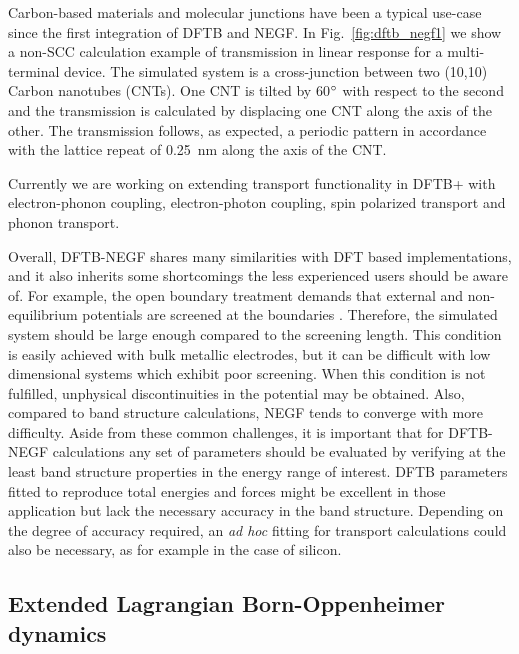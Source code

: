 \documentclass{revtex4-1}
\newcommand{\dftbp}{DFTB+}
\begin{document}
Carbon-based materials and molecular junctions have been a typical use-case
since the first integration of DFTB and NEGF.\cite{reimers2007, latessa2005,
  penazzi2013} In Fig.~\ref{fig:dftb_negf1} we show a non-SCC calculation
example of transmission in linear response for a multi-terminal device. The
simulated system is a cross-junction between two (10,10) Carbon nanotubes
(CNTs). One CNT is tilted by 60$\degree$ with respect to the second and the
transmission is calculated by displacing one CNT along the axis of the other. The transmission follows, as expected, a periodic pattern in accordance with
the lattice repeat of 0.25~nm along the axis of the CNT.

Currently we are working on extending transport functionality in \dftbp{} with
electron-phonon coupling,\cite{pecchia2004b, pecchia2007, penazzi2016,
  gagliardi2008} electron-photon coupling, spin polarized transport and phonon
transport.\cite{medrano15b, medrano16, Martinez19, MedranoRev}

Overall, DFTB-NEGF shares many similarities with DFT based implementations, and
it also inherits some shortcomings the less experienced users should be aware
of. For example, the open boundary treatment demands that external and
non-equilibrium potentials are screened at the boundaries \cite{haug2008}.
Therefore, the simulated system should be large enough compared to the screening
length.  This condition is easily achieved with bulk metallic electrodes, but it
can be difficult with low dimensional systems which exhibit poor screening. When
this condition is not fulfilled, unphysical discontinuities in the potential may
be obtained. Also, compared to band structure calculations, NEGF tends to
converge with more difficulty.\cite{ozaki2010} Aside from these common
challenges, it is important that for DFTB-NEGF calculations any set of
parameters should be evaluated by verifying at the least band structure
properties in the energy range of interest. DFTB parameters fitted to reproduce
total energies and forces might be excellent in those application but lack the
necessary accuracy in the band structure. Depending on the degree of accuracy
required, an {\it ad hoc} fitting for transport calculations could also be
necessary, as for example in the case of silicon.\cite{markov2015b}

\subsection{Extended Lagrangian Born-Oppenheimer dynamics}
\end{document}
